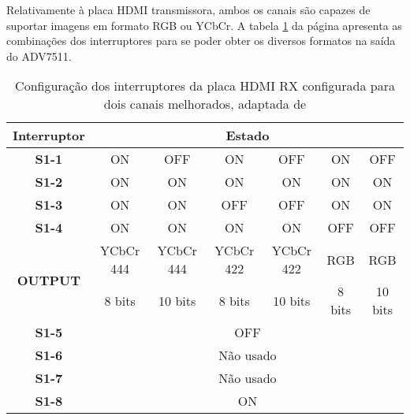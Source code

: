 Relativamente à placa HDMI transmissora, ambos os canais são capazes de suportar imagens em formato RGB ou YCbCr. A tabela \ref{table:HDMI_2ch_melhoradp_TX} da página \pageref{table:HDMI_2ch_melhoradp_TX} apresenta as combinações dos interruptores para se poder obter os diversos formatos na saída do ADV7511.
\begin{table}[h!]
	\centering
	\begin{tabular}{|c|c|c|c|c|c|c|}
		\hline
		\textbf{Interruptor}             & \multicolumn{6}{c|}{\textbf{Estado}}                             \\ \hline
		\textbf{S1-1}                    & ON        & OFF       & ON        & OFF       & ON     & OFF     \\ \hline
		\textbf{S1-2}                    & ON        & ON        & ON        & ON        & ON     & ON      \\ \hline
		\textbf{S1-3}                    & ON        & ON        & OFF       & OFF       & ON     & ON      \\ \hline
		\textbf{S1-4}                    & ON        & ON        & ON        & ON        & OFF    & OFF     \\ \hline
		\multirow{2}{*}{\textbf{OUTPUT}} & YCbCr 444 & YCbCr 444 & YCbCr 422 & YCbCr 422 & RGB    & RGB     \\ \cline{2-7} 
		& 8 bits    & 10 bits   & 8 bits    & 10 bits   & 8 bits & 10 bits \\ \hline
		\textbf{S1-5}                    & \multicolumn{6}{c|}{OFF}                                         \\ \hline
		\textbf{S1-6}                    & \multicolumn{6}{c|}{Não usado}                                   \\ \hline
		\textbf{S1-7}                    & \multicolumn{6}{c|}{Não usado}                                   \\ \hline
		\textbf{S1-8}                    & \multicolumn{6}{c|}{ON}                                          \\ \hline
	\end{tabular}
	\caption{Configuração dos interruptores da placa HDMI RX configurada para dois canais melhorados, adaptada de \cite{R013}}
	\label{table:HDMI_2ch_melhoradp_TX} 
\end{table}
